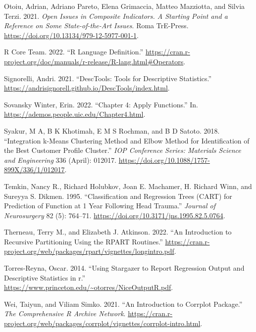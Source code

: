 \documentclass[
]{article}
\newlength{\cslhangindent}
\newlength{\cslentryspacingunit} %
\newenvironment{CSLReferences}[2] %
 {%
  \setlength{\parindent}{0pt}
  \ifodd #1
  \let\oldpar\par
  \def\par{\hangindent=\cslhangindent\oldpar}
  \fi
  \setlength{\parskip}{#2\cslentryspacingunit}
 }%
 {}
\begin{document}
\begin{CSLReferences}{1}{0}
\leavevmode{}%
Otoiu, Adrian, Adriano Pareto, Elena Grimaccia, Matteo Mazziotta, and Silvia Terzi. 2021. \emph{Open Issues in Composite Indicators. A Starting Point and a Reference on Some State-of-the-Art Issues}. Roma TrE-Press. \url{https://doi.org/10.13134/979-12-5977-001-1}.

\leavevmode{}%
R Core Team. 2022. {``R Language Definition.''} \url{https://cran.r-project.org/doc/manuals/r-release/R-lang.html\#Operators}.

\leavevmode{}%
Signorelli, Andri. 2021. {``DescTools: Tools for Descriptive Statistics.''} \url{https://andrisignorell.github.io/DescTools/index.html}.

\leavevmode{}%
Sovansky Winter, Erin. 2022. {``Chapter 4: Apply Functions.''} In. \url{https://ademos.people.uic.edu/Chapter4.html}.

\leavevmode{}%
Syakur, M A, B K Khotimah, E M S Rochman, and B D Satoto. 2018. {``Integration k-Means Clustering Method and Elbow Method for Identification of the Best Customer Profile Cluster.''} \emph{IOP Conference Series: Materials Science and Engineering} 336 (April): 012017. \url{https://doi.org/10.1088/1757-899X/336/1/012017}.

\leavevmode{}%
Temkin, Nancy R., Richard Holubkov, Joan E. Machamer, H. Richard Winn, and Sureyya S. Dikmen. 1995. {``Classification and Regression Trees (CART) for Prediction of Function at 1 Year Following Head Trauma.''} \emph{Journal of Neurosurgery} 82 (5): 764--71. \url{https://doi.org/10.3171/jns.1995.82.5.0764}.

\leavevmode{}%
Therneau, Terry M., and Elizabeth J. Atkinson. 2022. {``An Introduction to Recursive Partitioning Using the RPART Routines.''} \url{https://cran.r-project.org/web/packages/rpart/vignettes/longintro.pdf}.

\leavevmode{}%
Torres-Reyna, Oscar. 2014. {``Using Stargazer to Report Regression Output and Descriptive Statistics in r.''} \url{https://www.princeton.edu/~otorres/NiceOutputR.pdf}.

\leavevmode{}%
Wei, Taiyun, and Viliam Simko. 2021. {``An Introduction to Corrplot Package.''} \emph{The Comprehensive R Archive Network}. \url{https://cran.r-project.org/web/packages/corrplot/vignettes/corrplot-intro.html}.


\end{CSLReferences}
\end{document}
